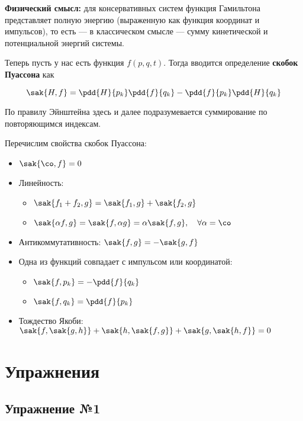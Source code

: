 \documentclass[12pt]{kiarticle}
\begin{document}
	\textbf{Физический смысл:} для консервативных систем функция Гамильтона представляет полную энергию (выраженную как функция координат и импульсов), то есть — в классическом смысле — сумму кинетической и потенциальной энергий системы.
	
	Теперь пусть у нас есть функция $ f(p, q, t) $. Тогда вводится определение\textbf{ скобок Пуассона} как
	
	\begin{equation}\label{sk}
	\sak{H, f} = \pdd{H}{p_k}\pdd{f}{q_k} - \pdd{f}{p_k}\pdd{H}{q_k} 
	\end{equation}
	
	По правилу Эйнштейна здесь и далее подразумевается суммирование по повторяющимся индексам.
	
	Перечислим свойства скобок Пуассона: 
	\begin{itemize}
		\item $ \sak{\co, f} = 0 $
		
		\item Линейность: 
		
		\begin{itemize}
			\item $ \sak{f_1 + f_2, g} = \sak{f_1, g} + \sak{f_2, g} $
			\item $ \sak{\alpha f, g} = \sak{f, \alpha g} = \alpha \sak{f, g},\quad \forall \alpha = \co $
		\end{itemize}
	
	\item Антикоммутативность: $ \sak{f, g} = - \sak{g, f} $
	
	\item Одна из функций совпадает с импульсом или координатой:
	
	\begin{itemize}
		\item $ \sak{f, p_k} = -\pdd{f}{q_k} $
			\item $ \sak{f, q_k} = \pdd{f}{p_k} $
	\end{itemize}
	
	\item Тождество Якоби: $ \sak{f,\sak{g, h}} + \sak{h,\sak{f, g}} + \sak{g,\sak{h, f}} = 0   $
	\end{itemize}
	 
	
	\section{Упражнения}
	
	\subsection{Упражнение №1}
	
\end{document}
